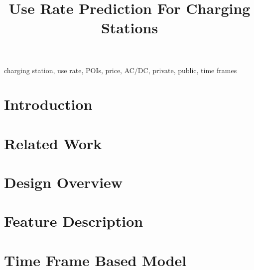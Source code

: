 \documentclass[conference]{IEEEtran}
\begin{document}
\title{Use Rate Prediction For Charging Stations\\}

\author{
\and
{}
}

\maketitle

\begin{abstract}

\end{abstract}

\begin{IEEEkeywords}
charging station, use rate, POIs, price, AC/DC, private, public, time frames
\end{IEEEkeywords}

\section{Introduction}



\section{Related Work}


\section{Design Overview}


\section{Feature Description}


\section{Time Frame Based Model}

\end{document}
